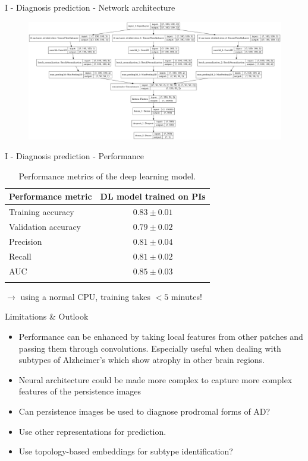 \documentclass[aspectratio=169, 10pt, dvipsnames]{beamer}
\begin{document}
\begin{frame}[fragile]{I - Diagnosis prediction - Network architecture}
  \begin{figure}
    \centering
    \includegraphics[width=\textwidth]{figures/model.png}
  \end{figure}
\end{frame}


\begin{frame}[fragile]{I - Diagnosis prediction - Performance}
\begin{table}
  \centering
  \begin{tabular}{lc}
    \toprule
    \textbf{Performance metric} & \textbf{DL model trained on PIs}\\
    \midrule
    Training accuracy & $0.83 \pm 0.01$  \\
    Validation accuracy & $0.79\pm 0.02$  \\
    Precision & $0.81\pm 0.04$  \\
    Recall & $0.81\pm 0.02$  \\
    AUC & $0.85\pm 0.03$  \\
    \bottomrule
    \vspace{1pt}
  \end{tabular}
  \caption{Performance metrics of the deep learning model.}
  \label{tab:performance}
\end{table}
$\rightarrow$ using a normal CPU, training  takes $<5$ minutes!
\end{frame}



\begin{frame}[fragile]{Limitations \& Outlook}
  \begin{itemize}
     \item Performance can be enhanced by taking local features from other patches and passing them through convolutions. Especially useful when dealing with subtypes of Alzheimer's which show atrophy in other brain regions.
     \item Neural architecture could be made more complex to capture more complex features of the persistence images
     \item Can persistence images be used to diagnose prodromal forms of AD?
     \item Use other representations for prediction.
     \item Use topology-based embeddings for subtype identification?
  \end{itemize}
\end{frame}
\end{document}
